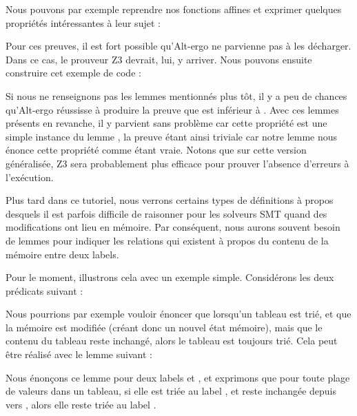 

Nous pouvons par exemple reprendre nos fonctions affines et exprimer quelques
propriétés intéressantes à leur sujet :






Pour ces preuves, il est fort possible qu'Alt-ergo ne parvienne pas à les
décharger. Dans ce cas, le prouveur Z3 devrait, lui, y arriver. Nous pouvons
ensuite construire cet exemple de code :






Si nous ne renseignons pas les lemmes mentionnés plus tôt, il y a peu de chances
qu'Alt-ergo réussisse à produire la preuve que  est inférieur à .
Avec ces lemmes présents en revanche, il y parvient sans problème car cette
propriété est une simple instance du lemme , la preuve
étant ainsi triviale car notre lemme nous énonce cette propriété comme étant vraie.
Notons que sur cette version généralisée, Z3 sera probablement plus efficace pour
prouver l'absence d'erreurs à l'exécution.





Plus tard dans ce tutoriel, nous verrons certains types de définitions à propos
desquels il est parfois difficile de raisonner pour les solveurs SMT quand des
modifications ont lieu en mémoire. Par conséquent, nous aurons souvent besoin de
lemmes pour indiquer les relations qui existent à propos du contenu de la mémoire
entre deux labels.


Pour le moment, illustrons cela avec un exemple simple. Considérons les deux
prédicats suivant :




Nous pourrions par exemple vouloir énoncer que lorsqu'un tableau est trié, et que
la mémoire est modifiée (créant donc un nouvel état mémoire), mais que le contenu du
tableau reste inchangé, alors le tableau est toujours trié. Cela peut être réalisé
avec le lemme suivant :




Nous énonçons ce lemme pour deux labels  et , et
exprimons que pour toute plage de valeurs dans un tableau, si elle est triée au label
, et reste inchangée depuis  vers ,
alors elle reste triée au label .


